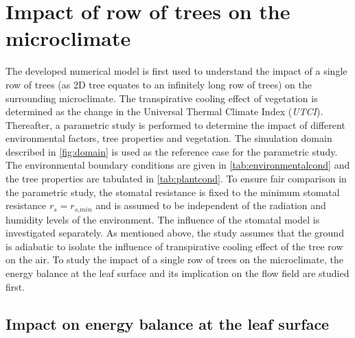 \section{Impact of row of trees on the microclimate}
\label{sec:impactofrows}

The developed numerical model is first used to understand the impact of a single row of trees (as 2D tree equates to an infinitely long row of trees) on the surrounding microclimate. The transpirative cooling effect of vegetation is determined as the change in the Universal Thermal Climate Index (\textit{UTCI}). Thereafter, a parametric study is performed to determine the impact of different environmental factors, tree properties and vegetation. The simulation domain described in \cref{fig:domain} is used as the reference case for the parametric study. The environmental boundary conditions are given in \cref{tab:environmentalcond} and the tree properties are tabulated in \cref{tab:plantcond}. To ensure fair comparison in the parametric study, the stomatal resistance is fixed to the minimum stomatal resistance $r_s=r_{\textit{s,min}}$ and is assumed to be independent of the radiation and humidity levels of the environment. The influence of the stomatal model is investigated separately. As mentioned above, the study assumes that the ground is adiabatic to isolate the influence of transpirative cooling effect of the tree row on the air. To study the impact of a single row of trees on the microclimate, the energy balance at the leaf surface and its implication on the flow field are studied first.

\subsection{Impact on energy balance at the leaf surface}

